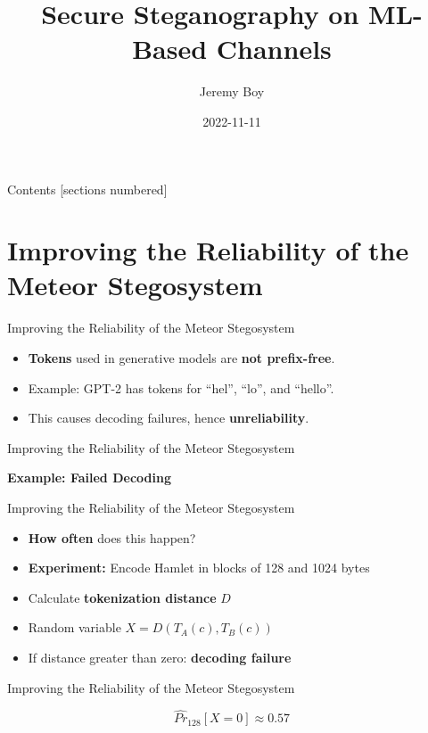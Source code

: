 \documentclass[10pt]{beamer}
\title{Secure Steganography on ML-Based Channels}
\date{2022-11-11}
\author{Jeremy Boy}
\institute{Universität zu Lübeck}
\begin{document}
\maketitle

\begin{frame}{Contents}
  [sections numbered]
  \tableofcontents[hideallsubsections]
\end{frame}

\section{Improving the Reliability of the Meteor Stegosystem}

\begin{frame}{Improving the Reliability of the Meteor Stegosystem}
	\begin{itemize}[<+->]
		\item \textbf{Tokens} used in generative models are \textbf{not prefix-free}.
		\item Example: GPT-2 has tokens for ``hel'', ``lo'', and ``hello''.
		\item This causes decoding failures, hence \textbf{unreliability}.
	\end{itemize}
\end{frame}

\begin{frame}{Improving the Reliability of the Meteor Stegosystem}
	\begin{center}
		\textbf{Example: Failed Decoding}
	\end{center}
\end{frame}

\begin{frame}{Improving the Reliability of the Meteor Stegosystem}
	\begin{itemize}[<+->]
		\item \textbf{How often} does this happen?
		\item \textbf{Experiment:} Encode Hamlet in blocks of 128 and 1024 bytes
		\item Calculate \textbf{tokenization distance} $D$
		\item Random variable $X = D(T_A(c), T_B(c))$
		\item If distance greater than zero: \textbf{decoding failure}
	\end{itemize}
\end{frame}

\begin{frame}{Improving the Reliability of the Meteor Stegosystem}
	\centering
	
	$$\hat{Pr}_{128}[X=0] \approx 0.57$$
\end{frame}
\end{document}
